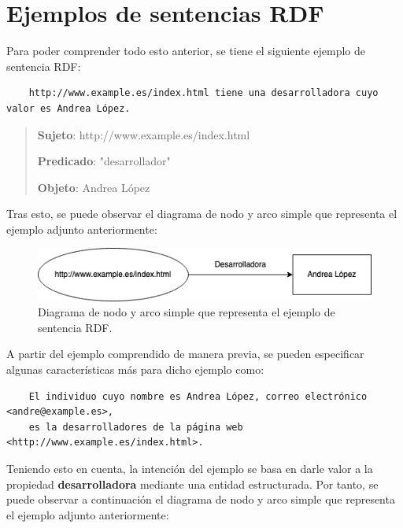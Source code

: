 \documentclass[11pt]{report}
\begin{document}
	\section{Ejemplos de sentencias RDF}
	Para poder comprender todo esto anterior, se tiene el siguiente ejemplo de sentencia RDF:

\begin{verbatim}
	http://www.example.es/index.html tiene una desarrolladora cuyo valor es Andrea López.
\end{verbatim}

\begin{quote}
	\textbf{Sujeto}: http://www.example.es/index.html

	\textbf{Predicado}: "desarrollador"

	\textbf{Objeto}: Andrea López 
\end{quote}	

	Tras esto, se puede observar el diagrama de nodo y arco simple que representa el ejemplo adjunto anteriormente:

	\begin{figure}[H]
		\centering
		\includegraphics[scale=0.7]{../img/Diagrama-Nodo-Arco.png}
		\caption{Diagrama de nodo y arco simple que representa el ejemplo de sentencia RDF.}
		\label{fig:Diagrama-Nodo-Arco}
	\end{figure}


A partir del ejemplo comprendido de manera previa, se pueden especificar algunas características más para dicho ejemplo como:

\begin{verbatim}
	El individuo cuyo nombre es Andrea López, correo electrónico <andre@example.es>, 
	es la desarrolladores de la página web <http://www.example.es/index.html>.
\end{verbatim}

Teniendo esto en cuenta, la intención del ejemplo se basa en darle valor a la propiedad \textbf{desarrolladora} mediante una entidad estructurada. Por tanto, se puede observar a continuación el diagrama de nodo y arco simple que representa el ejemplo adjunto anteriormente:
\end{document}
